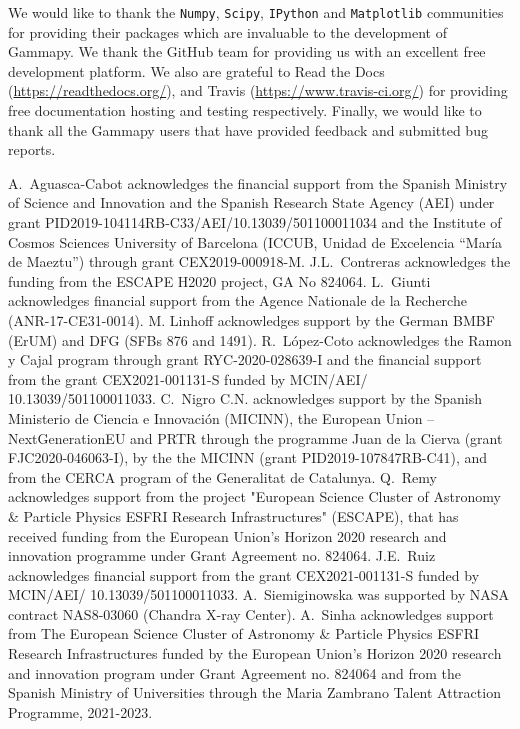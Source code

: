 \documentclass[longauth]{aa}
\newcommand{\ReadthedocsUrl}{\url{https://readthedocs.org/}\xspace}
\newcommand{\TravisUrl}{\url{https://www.travis-ci.org/}\xspace}
\newcommand{\gammapy}{Gammapy\xspace}
\newcommand{\github}{GitHub\xspace}
\begin{document}
\begin{acknowledgements}

        We would like to thank the \texttt{Numpy}, \texttt{Scipy}, \texttt{IPython} and
        \texttt{Matplotlib} communities for providing their packages which are
        invaluable to the development of \gammapy. We thank the \github team for
        providing us with an excellent free development platform. We also are grateful
        to Read the Docs (\ReadthedocsUrl), and Travis (\TravisUrl) for providing free
        documentation hosting and testing respectively. Finally, we would like to thank
        all the \gammapy users that have provided feedback and submitted bug reports.

        A.~Aguasca-Cabot acknowledges the financial support from the Spanish Ministry of Science and Innovation
        and the Spanish Research State Agency (AEI) under grant PID2019-104114RB-C33/AEI/10.13039/501100011034
        and the Institute of Cosmos Sciences University of Barcelona (ICCUB, Unidad de Excelencia “María de Maeztu”)
        through grant CEX2019-000918-M. J.L.~Contreras acknowledges the funding from the ESCAPE H2020 project, GA No 824064.
        L.~Giunti acknowledges financial support from the Agence Nationale de la Recherche (ANR-17-CE31-0014). M. Linhoff
        acknowledges support by the German BMBF (ErUM) and DFG (SFBs 876 and 1491).
        R.~López-Coto acknowledges the Ramon y Cajal program through grant RYC-2020-028639-I and the financial support
        from the grant CEX2021-001131-S funded by MCIN/AEI/ 10.13039/501100011033. C.~Nigro C.N. acknowledges support by
        the Spanish Ministerio de Ciencia e Innovación (MICINN), the European Union – NextGenerationEU and PRTR  through
        the programme Juan de la Cierva (grant FJC2020-046063-I), by the the MICINN (grant PID2019-107847RB-C41), and from
        the CERCA program of the Generalitat de Catalunya. Q.~Remy acknowledges support from the project "European Science
        Cluster of Astronomy \& Particle Physics ESFRI Research Infrastructures" (ESCAPE), that has received funding from
        the European Union’s Horizon 2020 research and innovation programme under Grant Agreement no. 824064. J.E.~Ruiz
        acknowledges financial support from the grant
        CEX2021-001131-S funded by MCIN/AEI/ 10.13039/501100011033. A.~Siemiginowska was supported by NASA contract
        NAS8-03060 (Chandra X-ray Center). A.~Sinha acknowledges support from The European Science Cluster of Astronomy \&
        Particle Physics ESFRI Research Infrastructures  funded by the European Union’s Horizon 2020 research and
        innovation program under Grant Agreement no. 824064 and from the Spanish Ministry of Universities through the
        Maria Zambrano Talent Attraction Programme, 2021-2023.


\end{acknowledgements}
\end{document}

